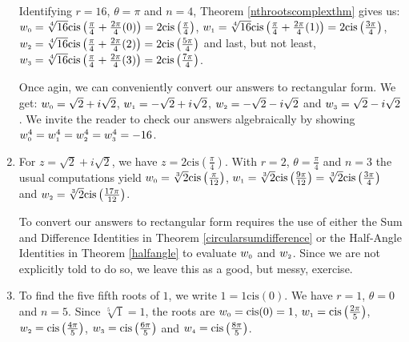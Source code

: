 \documentclass{ximera}
\begin{document}
\begin{example}
\begin{enumerate}
\smallskip

Identifying $r = 16$, $\theta = \pi$ and $n = 4$,  Theorem \ref{nthrootscomplexthm} gives us:  $w_{\text{\tiny$0$}} = \sqrt[4]{16} \text{cis}\left(\frac{\pi}{4} + \frac{2\pi}{4} (0)\right) = 2\text{cis}\left(\frac{\pi}{4}\right)$, $w_{\text{\tiny$1$}} = \sqrt[4]{16} \text{cis}\left(\frac{\pi}{4} + \frac{2\pi}{4} (1)\right) = 2\text{cis}\left(\frac{3\pi}{4}\right)$, $w_{\text{\tiny$2$}} = \sqrt[4]{16} \text{cis}\left(\frac{\pi}{4} + \frac{2\pi}{4} (2)\right) = 2\text{cis}\left(\frac{5\pi}{4}\right)$ and last, but not least,  $w_{\text{\tiny$3$}} = \sqrt[4]{16} \text{cis}\left(\frac{\pi}{4} + \frac{2\pi}{4} (3)\right) = 2\text{cis}\left(\frac{7\pi}{4}\right)$.  

\smallskip

Once agin, we can conveniently convert our answers to rectangular form. We get:  $w_{\text{\tiny$0$}} = \sqrt{2} + i\sqrt{2}$,  $w_{\text{\tiny$1$}} = -\sqrt{2} + i\sqrt{2}$,  $w_{\text{\tiny$2$}} = -\sqrt{2} - i\sqrt{2}$ and  $w_{\text{\tiny$3$}} = \sqrt{2} - i\sqrt{2}$.  We invite the reader to check  our answers algebraically by showing  $w_{\text{\tiny$0$}}^{4} = w_{\text{\tiny$1$}} ^{4} = w_{\text{\tiny$2$}}^{4}  = w_{\text{\tiny$3$}}^{4} = -16$.

\item  For $z = \sqrt{2} + i \sqrt{2}$, we have $z = 2\text{cis}\left(\frac{\pi}{4}\right)$.  With $r = 2$, $\theta = \frac{\pi}{4}$ and $n =3$ the usual computations yield $w_{\text{\tiny$0$}} = \sqrt[3]{2} \text{cis}\left(\frac{\pi}{12}\right)$,  $w_{\text{\tiny$1$}} = \sqrt[3]{2} \text{cis}\left(\frac{9\pi}{12}\right) = \sqrt[3]{2} \text{cis}\left(\frac{3\pi}{4}\right) $ and  $w_{\text{\tiny$2$}} = \sqrt[3]{2} \text{cis}\left(\frac{17\pi}{12}\right)$. 

\smallskip

 To  convert our answers to rectangular form requires the use of  either the Sum and Difference Identities in Theorem \ref{circularsumdifference} or the Half-Angle Identities in Theorem \ref{halfangle} to evaluate $w_{\text{\tiny$0$}}$ and  $w_{\text{\tiny$2$}}$.  Since we are not explicitly told to do so, we leave this as a good, but messy, exercise.

\item  To find the five fifth roots of $1$, we write $1 = 1 \text{cis}(0)$.  We have $r = 1$, $\theta = 0$ and $n = 5$. Since $\sqrt[5]{1} = 1$, the roots are  $w_{\text{\tiny$0$}} = \text{cis}(0) = 1$, $w_{\text{\tiny$1$}} = \text{cis}\left(\frac{2\pi}{5}\right)$, $w_{\text{\tiny$2$}} = \text{cis}\left(\frac{4\pi}{5}\right)$, $w_{\text{\tiny$3$}} = \text{cis}\left(\frac{6\pi}{5}\right)$ and $w_{\text{\tiny$4$}} = \text{cis}\left(\frac{8\pi}{5}\right)$. 


\end{enumerate}
\end{example}
\end{document}
